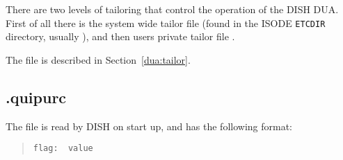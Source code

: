 There are two levels of tailoring that control the operation of the DISH DUA.
First of all there is the system wide tailor file 
(found in the ISODE \verb"ETCDIR" directory, usually ), and
then users private tailor file .

The file  is described in Section~\ref{dua:tailor}.

\subsection {.quipurc}
\label{quipurc}
The file  is read by DISH on start up, and
has the following format:

\begin{quote}\begin{verbatim}
flag:  value
\end{verbatim}\end{quote}

